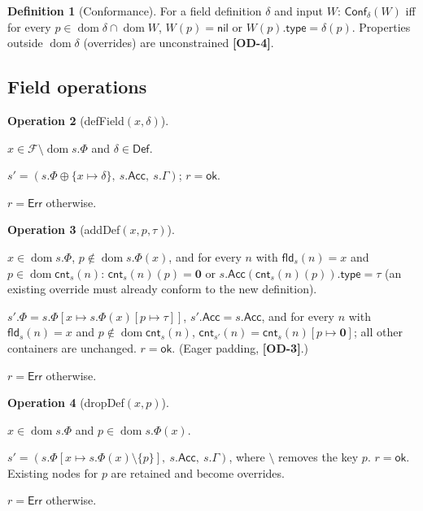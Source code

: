 \documentclass[11pt,a4paper]{article}
\theoremstyle{definition}
\newtheorem{definition}{Definition}[section]
\newtheorem{operation}[definition]{Operation}
\theoremstyle{plain}
\theoremstyle{remark}
\newcommand{\od}[1]{\textsf{\textbf{\textcolor{BrickRed}{[OD-#1]}}}}
\newcommand{\Fld}{\mathcal{F}}
\newcommand{\Def}{\mathsf{Def}}
\newcommand{\nul}{\mathbf{0}}
\newcommand{\nil}{\mathsf{nil}}
\newcommand{\Err}{\mathsf{Err}}
\newcommand{\ok}{\mathsf{ok}}
\newcommand{\dom}{\operatorname{dom}}
\newcommand{\fld}{\mathsf{fld}}
\newcommand{\cnt}{\mathsf{cnt}}
\newcommand{\Acc}{\mathsf{Acc}}
\begin{document}
\begin{definition}[Conformance]
For a field definition $\delta$ and input $W$: $\mathsf{Conf}_\delta(W)$ iff for every $p\in\dom\delta\cap\dom W$,
$W(p)=\nil$ or $W(p).\mathsf{type}=\delta(p)$. Properties outside $\dom\delta$ (overrides) are unconstrained \od{4}.
\end{definition}

\subsection{Field operations}

\begin{operation}[\textsf{defField}$(x,\delta)$]\label{op:deffield}
\begin{description}[leftmargin=2.2cm,labelwidth=2cm,font=\bfseries]
\item[Precondition] $x\in\Fld\setminus\dom s.\Phi$ and $\delta\in\Def$.
\item[Effect] $s'=(s.\Phi\oplus\{x\mapsto\delta\},\ s.\Acc,\ s.\Gamma)$; $r=\ok$.
\item[Failure] $r=\Err$ otherwise.
\end{description}
\end{operation}

\begin{operation}[\textsf{addDef}$(x,p,\tau)$]\label{op:adddef}
\begin{description}[leftmargin=2.2cm,labelwidth=2cm,font=\bfseries]
\item[Precondition] $x\in\dom s.\Phi$, $p\notin\dom s.\Phi(x)$, and for every $n$ with $\fld_s(n)=x$ and $p\in\dom\cnt_s(n)$:
$\cnt_s(n)(p)=\nul$ or $s.\Acc(\cnt_s(n)(p)).\mathsf{type}=\tau$
(an existing override must already conform to the new definition).
\item[Effect] $s'.\Phi=s.\Phi[x\mapsto s.\Phi(x)[p\mapsto\tau]]$, $s'.\Acc=s.\Acc$, and for every $n$ with $\fld_s(n)=x$ and $p\notin\dom\cnt_s(n)$,
$\cnt_{s'}(n)=\cnt_s(n)[p\mapsto\nul]$; all other containers are unchanged. $r=\ok$. (Eager padding, \od{3}.)
\item[Failure] $r=\Err$ otherwise.
\end{description}
\end{operation}

\begin{operation}[\textsf{dropDef}$(x,p)$]\label{op:dropdef}
\begin{description}[leftmargin=2.2cm,labelwidth=2cm,font=\bfseries]
\item[Precondition] $x\in\dom s.\Phi$ and $p\in\dom s.\Phi(x)$.
\item[Effect] $s'=(s.\Phi[x\mapsto s.\Phi(x)\setminus\{p\}],\ s.\Acc,\ s.\Gamma)$, where $\setminus$ removes the key $p$. $r=\ok$.
Existing nodes for $p$ are retained and become overrides.
\item[Failure] $r=\Err$ otherwise.
\end{description}
\end{operation}
\end{document}
